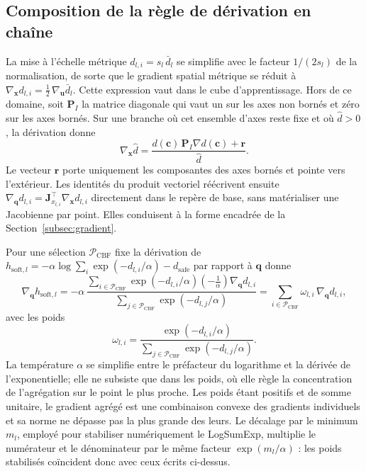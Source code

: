 \subsection*{Composition de la règle de dérivation en chaîne} La mise à l'échelle métrique $d_{l,i}=s_l\,\bar{d}_l$ se simplifie avec le facteur $1/(2s_l)$ de la normalisation, de sorte que le gradient spatial métrique se réduit à $\nabla_{\mathbf{x}}d_{l,i}=\tfrac{1}{2}\,\nabla_{\mathbf{u}}\bar{d}_l$. Cette expression vaut dans le cube d'apprentissage. Hors de ce domaine, soit $\mathbf{P}_{I}$ la matrice diagonale qui vaut un sur les axes non bornés et zéro sur les axes bornés. Sur une branche où cet ensemble d'axes reste fixe et où $\hat d>0$, la dérivation donne
\begin{equation}
\nabla_{\mathbf{x}} \hat{d}
= \frac{d(\mathbf{c})\,\mathbf{P}_{I}\nabla d(\mathbf{c})+\boldsymbol{r}}{\hat{d}}.
\end{equation}
Le vecteur $\boldsymbol{r}$ porte uniquement les composantes des axes bornés et pointe vers l'extérieur. Les identités du produit vectoriel réécrivent ensuite $\nabla_{\mathbf{q}}d_{l,i}=\mathbf{J}_{x_{l,i}}^{\top}\nabla_{\mathbf{x}}d_{l,i}$ directement dans le repère de base, sans matérialiser une Jacobienne par point. Elles conduisent à la forme encadrée de la Section~\ref{subsec:gradient}.

Pour une sélection $\mathcal{P}_{\mathrm{CBF}}$ fixe la dérivation de $h_{\mathrm{soft},l}=-\alpha\log\sum_{i}\exp(-d_{l,i}/\alpha)-d_{\mathrm{safe}}$ par rapport à $\mathbf{q}$ donne
\begin{equation}
\nabla_{\mathbf{q}}h_{\mathrm{soft},l}
=-\alpha\,
\frac{\sum_{i\in\mathcal{P}_{\mathrm{CBF}}}\exp(-d_{l,i}/\alpha)\left(-\tfrac{1}{\alpha}\right)\nabla_{\mathbf{q}}d_{l,i}}
{\sum_{j\in\mathcal{P}_{\mathrm{CBF}}}\exp(-d_{l,j}/\alpha)}
=\sum_{i\in\mathcal{P}_{\mathrm{CBF}}}\omega_{l,i}\,\nabla_{\mathbf{q}}d_{l,i},
\end{equation}
avec les poids
\begin{equation}
\omega_{l,i}
=\frac{\exp(-d_{l,i}/\alpha)}{\sum_{j\in\mathcal{P}_{\mathrm{CBF}}}\exp(-d_{l,j}/\alpha)}.
\end{equation}
La température $\alpha$ se simplifie entre le préfacteur du logarithme et la dérivée de l'exponentielle; elle ne subsiste que dans les poids, où elle règle la concentration de l'agrégation sur le point le plus proche. Les poids étant positifs et de somme unitaire, le gradient agrégé est une combinaison convexe des gradients individuels et sa norme ne dépasse pas la plus grande des leurs. Le décalage par le minimum $m_l$, employé pour stabiliser numériquement le LogSumExp, multiplie le numérateur et le dénominateur par le même facteur $\exp(m_l/\alpha)$ : les poids stabilisés coïncident donc avec ceux écrits ci-dessus.

